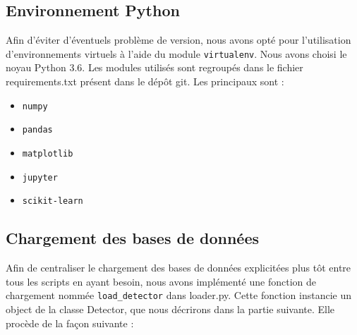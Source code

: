 \documentclass[a4paper]{report}
\begin{document}
\subsection{Environnement Python}

Afin d'éviter d'éventuels problème de version, nous avons opté pour l'utilisation d'environnements virtuels à l'aide du module \texttt{virtualenv}. Nous avons choisi le noyau Python 3.6. Les modules utilisés sont regroupés dans le fichier requirements.txt présent dans le dépôt git. Les principaux sont :
\begin{itemize}
\item \texttt{numpy}
\item \texttt{pandas}
\item \texttt{matplotlib}
\item \texttt{jupyter}
\item \texttt{scikit-learn}
\end{itemize}

\subsection{Chargement des bases de données}

Afin de centraliser le chargement des bases de données explicitées plus tôt entre tous les scripts en ayant besoin, nous avons implémenté une fonction de chargement nommée \texttt{load\_detector} dans loader.py. Cette fonction instancie un object de la classe Detector, que nous décrirons dans la partie suivante. Elle procède de la façon suivante :
\end{document}
